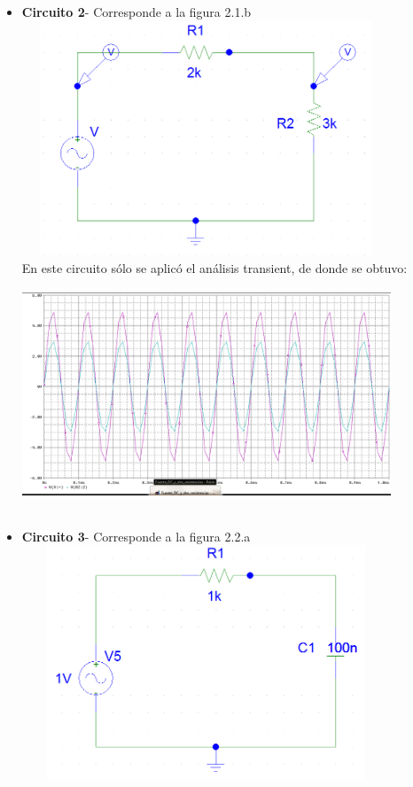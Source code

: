 \documentclass[12pt]{article}
\begin{document}
\begin{itemize}
		\item \textbf{Circuito 2}- Corresponde a la figura 2.1.b\\ 
		
		\includegraphics[width=11cm,height=7cm]{Img/ac_dos_resis.png}\\
		
		\noindent En este circuito sólo se aplicó el análisis transient, de donde se obtuvo:\\
		
		\includegraphics[width=11cm,height=7cm]{Img/Fuente_AC_y_dos_resistencias.png}\\
		
		\item \textbf{Circuito 3}- Corresponde a la figura 2.2.a\\ 
		
		\includegraphics[width=11cm,height=7cm]{Img/ac_rc.png}\\
		

\end{itemize}
\end{document}
